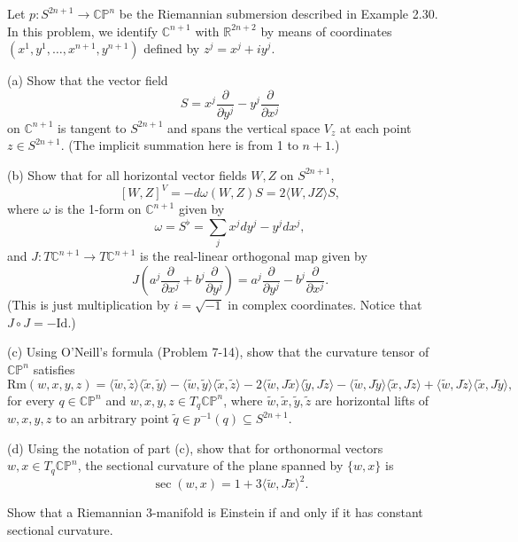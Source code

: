 \begin{exercise}
\label{prob:complex-projective-space-curvature}
Let $p: S^{2n+1} \to \mathbb{CP}^n$ be the Riemannian submersion described in Example 2.30. In this problem, we identify $\mathbb{C}^{n+1}$ with $\mathbb{R}^{2n+2}$ by means of coordinates $(x^1, y^1, \ldots, x^{n+1}, y^{n+1})$ defined by $z^j = x^j + iy^j$.

(a) Show that the vector field
\[
S = x^j \frac{\partial}{\partial y^j} - y^j \frac{\partial}{\partial x^j}
\]
on $\mathbb{C}^{n+1}$ is tangent to $S^{2n+1}$ and spans the vertical space $V_z$ at each point $z \in S^{2n+1}$. (The implicit summation here is from 1 to $n+1$.)

(b) Show that for all horizontal vector fields $W, Z$ on $S^{2n+1}$,
\[
[W, Z]^V = -d\omega(W, Z)S = 2\langle W, JZ \rangle S,
\]
where $\omega$ is the 1-form on $\mathbb{C}^{n+1}$ given by
\[
\omega = S^\flat = \sum_j x^j dy^j - y^j dx^j,
\]
and $J: T\mathbb{C}^{n+1} \to T\mathbb{C}^{n+1}$ is the real-linear orthogonal map given by
\[
J\left(a^j \frac{\partial}{\partial x^j} + b^j \frac{\partial}{\partial y^j}\right) = a^j \frac{\partial}{\partial y^j} - b^j \frac{\partial}{\partial x^j}.
\]
(This is just multiplication by $i = \sqrt{-1}$ in complex coordinates. Notice that $J \circ J = -\text{Id}$.)

(c) Using O'Neill's formula (Problem 7-14), show that the curvature tensor of $\mathbb{CP}^n$ satisfies
\[
\text{Rm}(w, x, y, z) = \langle \tilde{w}, \tilde{z} \rangle \langle \tilde{x}, \tilde{y} \rangle - \langle \tilde{w}, \tilde{y} \rangle \langle \tilde{x}, \tilde{z} \rangle
- 2\langle \tilde{w}, J\tilde{x} \rangle \langle \tilde{y}, J\tilde{z} \rangle - \langle \tilde{w}, J\tilde{y} \rangle \langle \tilde{x}, J\tilde{z} \rangle
+ \langle \tilde{w}, J\tilde{z} \rangle \langle \tilde{x}, J\tilde{y} \rangle,
\]
for every $q \in \mathbb{CP}^n$ and $w, x, y, z \in T_q\mathbb{CP}^n$, where $\tilde{w}, \tilde{x}, \tilde{y}, \tilde{z}$ are horizontal lifts of $w, x, y, z$ to an arbitrary point $\tilde{q} \in p^{-1}(q) \subseteq S^{2n+1}$.

(d) Using the notation of part (c), show that for orthonormal vectors $w, x \in T_q\mathbb{CP}^n$, the sectional curvature of the plane spanned by $\{w, x\}$ is
\[
\sec(w, x) = 1 + 3\langle \tilde{w}, J\tilde{x} \rangle^2.
\]
\end{exercise}

\begin{exercise}
\label{prob:einstein-sectional-curvature}
Show that a Riemannian 3-manifold is Einstein if and only if it has constant sectional curvature.
\end{exercise}

